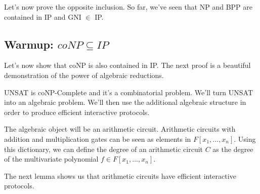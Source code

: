 \documentclass{article}
\theoremstyle{definition}
\begin{document}
Let's now prove the opposite inclusion. So far, we've seen that NP and BPP are contained in IP and GNI $\in$ IP.

\newpage

\subsection{Warmup: $coNP \subseteq IP$}

Let's now show that coNP is also contained in IP. The next proof is a beautiful demonstration of the power of algebraic reductions.

UNSAT is coNP-Complete and it's a combinatorial problem. We'll turn UNSAT into an algebraic problem. We'll then use the
additional algebraic structure in order to produce efficient interactive protocols. 

The algebraic object will be an arithmetic circuit. Arithmetic circuits with addition and multiplication gates can 
be seen as elements in $F[x_{1},...,x_{n}]$. Using this dictionary, we can define the degree of an arithmetic 
circuit $C$ as the degree of the multivariate polynomial $f \in F[x_{1},...,x_{n}]$.

The next lemma shows us that arithmetic circuits have efficient interactive protocols.
\end{document}
